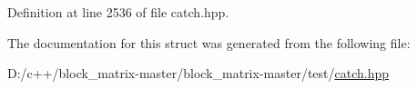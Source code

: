 Definition at line 2536 of file catch.\+hpp.



The documentation for this struct was generated from the following file\+:\begin{DoxyCompactItemize}
\item 
D\+:/c++/block\+\_\+matrix-\/master/block\+\_\+matrix-\/master/test/\mbox{\hyperlink{catch_8hpp}{catch.\+hpp}}\end{DoxyCompactItemize}
